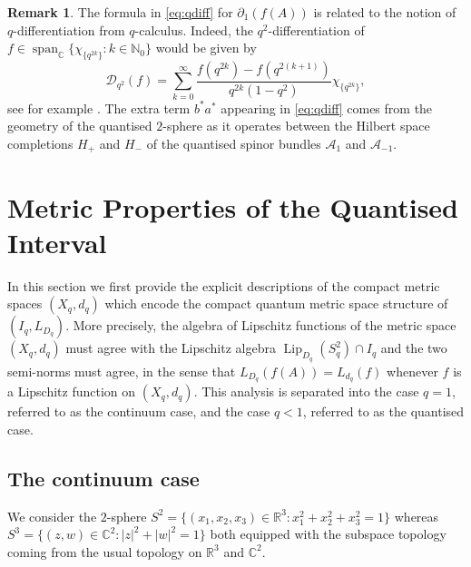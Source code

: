 \documentclass[11pt, reqno, a4paper, final]{amsart}
\theoremstyle{plain}
\newtheorem{theorem}{Theorem}[section]
\theoremstyle{definition}
\newtheorem{remark}[thm]{Remark}
\newcommand{\NN}{{\mathbb N}}
\newcommand{\RR}{{\mathbb R}}
\newcommand{\CC}{{\mathbb C}}
\newcommand{\Lip}{\operatorname{Lip}}
\newcommand{\black}{\color{black}}
\begin{document}
{\black \begin{remark}
The formula in \eqref{eq:qdiff} for $\partial_1(f(A))$ is related to the notion of $q$-differentiation from $q$-calculus. Indeed, the $q^2$-differentiation of $f \in \operatorname{span}_\CC\{\chi_{\lbrace q^{2k}\rbrace} : k\in \NN_0\}$ would be given by
\[
\mathcal{D}_{q^2}(f) = \sum_{k = 0}^\infty \frac{f(q^{2k}) - f(q^{2(k+1)})}{q^{2k}(1-q^2)} \chi_{\lbrace q^{2k}\rbrace} ,
\]
see for example \cite[Chapter 2.2]{Klimyk}. The extra term $b^* a^*$ appearing in \eqref{eq:qdiff} comes from the geometry of the quantised $2$-sphere as it operates between the Hilbert space completions $H_+$ and $H_-$ of the quantised spinor bundles $\mathcal{A}_1$ and $\mathcal{A}_{-1}$.
\end{remark}}




\section{Metric Properties of the Quantised Interval}
In this section we first provide the explicit descriptions of the compact metric spaces $(X_q,d_q)$ which encode the compact quantum metric space structure of $(I_q,L_{D_q})$. More precisely, the algebra of Lipschitz functions of the metric space $(X_q,d_q)$ must agree with the Lipschitz algebra $\Lip_{D_q}(S_q^2)\cap I_q$  and the two semi-norms must agree, in the  sense that $L_{D_q}(f(A))=L_{d_q}(f)$ whenever $f$ is a Lipschitz function on $(X_q,d_q)$. This analysis is separated into the case $q=1$, referred to as the {\black continuum} case, and the case $q<1$, referred to as the {\black quantised} case.

\subsection{The continuum case}\label{subsec:commutative}
{\black We consider the $2$-sphere $S^2 = \{ (x_1,x_2,x_3) \in \RR^3 : x_1^2 + x_2^2 + x_3^2 = 1 \}$ whereas $S^3 = \{ (z,w) \in \CC^2 : |z|^2 + |w|^2 = 1 \}$ both equipped with the subspace topology coming from the usual topology on $\RR^3$ and $\CC^2$.} 
\end{document}
